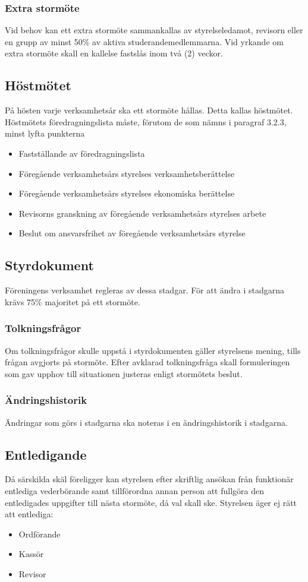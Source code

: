 \documentclass[11pt,a4paper]{article}
\begin{document}
\subsubsection{Extra stormöte}
Vid behov kan ett extra stormöte sammankallas av styrelseledamot, revisorn eller en grupp av minst 50\% av aktiva studerandemedlemmarna. Vid yrkande om extra stormöte skall en kallelse fastslås inom två (2) veckor.
\subsection{Höstmötet}
På hösten varje verksamhetsår ska ett stormöte hållas. Detta kallas höstmötet. Höstmötets föredragningslista måste, förutom de som nämns i paragraf 3.2.3, minst lyfta punkterna
\begin{itemize}
    \item Fastställande av föredragningslista
	\item Föregående verksamhetsårs styrelses verksamhetsberättelse
	\item Föregående verksamhetsårs styrelses ekonomiska berättelse
	\item Revisorns granskning av föregående verksamhetsårs styrelses arbete
	\item Beslut om ansvarsfrihet av föregående verksamhetsårs styrelse
\end{itemize}
\subsection{Styrdokument}
Föreningens verksamhet regleras av dessa stadgar. För att ändra i stadgarna krävs 75\% majoritet på ett stormöte.
\subsubsection{Tolkningsfrågor}
Om tolkningsfrågor skulle uppstå i styrdokumenten gäller styrelsens mening, tills frågan avgjorts på stormöte. Efter avklarad tolkningsfråga skall formuleringen som gav upphov till situationen justeras enligt stormötets beslut.
\subsubsection{Ändringshistorik}
Ändringar som görs i stadgarna ska noteras i en ändringshistorik i stadgarna.
\subsection{Entledigande}
Då särskilda skäl föreligger kan styrelsen efter skriftlig ansökan från funktionär entlediga vederbörande samt tillförordna annan person att fullgöra den entledigades uppgifter till nästa stormöte, då val skall ske. Styrelsen äger ej rätt att entlediga:
\begin{itemize}
	\item Ordförande
	\item Kassör
	\item Revisor
\end{itemize}
\end{document}
